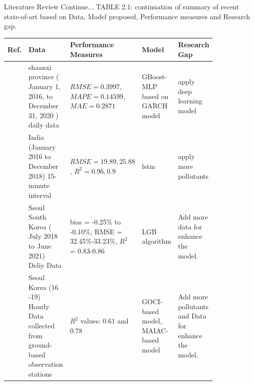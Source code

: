 \documentclass[12pt, aspectratio=169]{beamer}
\begin{document}
\begin{frame}{Literature Review  \tiny{Continue...}}
	\centering
	\scriptsize {TABLE 2.1: continuation of summary of recent state-of-art based on Data,  Model proposed,  Performance measures and Research gap.}\\
	\begin{table}
		\centering
		\begin{tabular}{|p{0.03\linewidth}|p{0.29\linewidth}|p{0.15\linewidth}|p{0.16\linewidth}|p{0.21\linewidth}|}
			\hline
			\footnotesize \textbf {Ref.} & \footnotesize \textbf { Data} & \footnotesize \textbf {Performance Measures } & \footnotesize \textbf {Model} & \footnotesize \textbf {Research Gap }  \\ \hline
			\scriptsize \cite{DAI2022131898} \scriptsize &shaanxi province ( January 1,  2016, to December 31,  2020 ) daily data \scriptsize & $RMSE=0.3997$, $MAPE=0.14599$, $MAE=0.2871$ \scriptsize &GBoost-MLP based on GARCH model \scriptsize & apply deep learning model \\  \hline
 			\scriptsize \cite{AGGARWAL2021129660} \scriptsize & India (January 2016 to December 2018) 15-minute interval  \scriptsize & $RMSE=19.89, 25.88$ ,  $R^2=0.96, 0.9$ \scriptsize &lstm\scriptsize &apply more pollutants \\\hline
			 \scriptsize \cite{kim2022short}         \scriptsize & Seoul South Korea ( July 2018 to   June 2021) Deliy Data                                                 \scriptsize & bias = -0.25\% to -0.10\%,  RMSE =   32.45\%-33.23\%,  $R^2$ = 0.83-0.86                                     \scriptsize & LGB algorithm                                                       \scriptsize & Add more data for enhance the model.                                                                            \\ \hline
			 \scriptsize \cite{lee2021potential}            \scriptsize & Seoul Korea (16 -19) Hourly Data collected from ground-based observation stations                      \scriptsize & $R^2$ values:  0.61 and 0.78                                                                                \scriptsize & GOCI-based model, MAIAC-based model                                \scriptsize & Add more pollutants and Data for enhance the model.                                                                   \\ \hline
		\end{tabular}
	\end{table}
\end{frame}
\end{document}
